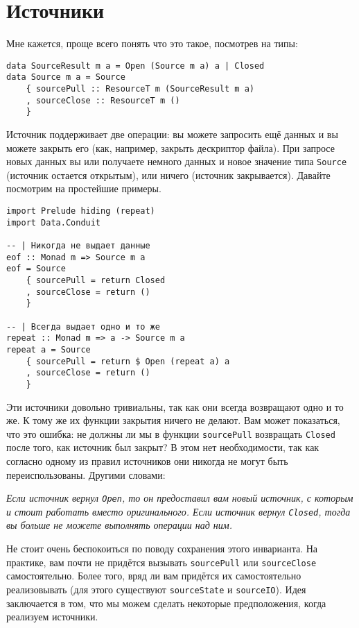 \section{Источники}

Мне кажется, проще всего понять что это такое, посмотрев на типы:
\begin{lstlisting}
data SourceResult m a = Open (Source m a) a | Closed
data Source m a = Source
    { sourcePull :: ResourceT m (SourceResult m a)
    , sourceClose :: ResourceT m ()
    }
\end{lstlisting}
Источник поддерживает две операции: вы можете запросить ещё данных и вы можете закрыть его (как,
например, закрыть дескриптор файла). При запросе новых данных вы или получаете немного
данных и новое значение типа \lstinline=Source= (источник остается открытым), или
ничего (источник закрывается). Давайте посмотрим на простейшие примеры.
\begin{lstlisting}
import Prelude hiding (repeat)
import Data.Conduit

-- | Никогда не выдает данные
eof :: Monad m => Source m a
eof = Source
    { sourcePull = return Closed
    , sourceClose = return ()
    }

-- | Всегда выдает одно и то же
repeat :: Monad m => a -> Source m a
repeat a = Source
    { sourcePull = return $ Open (repeat a) a
    , sourceClose = return ()
    }
\end{lstlisting}
Эти источники довольно тривиальны, так как они всегда возвращают одно и то же. К тому
же их функции закрытия ничего не делают. Вам может показаться, что это ошибка: не должны ли
мы в функции \lstinline=sourcePull= возвращать \lstinline=Closed= после того, как
источник был
закрыт? В этом нет необходимости, так как согласно одному из правил
источников они никогда не могут быть переиспользованы. Другими словами:

\textit{Если источник вернул \lstinline=Open=, то он предоставил вам новый источник, с
которым и
стоит работать вместо оригинального. Если источник вернул \lstinline=Closed=, тогда вы
больше не можете выполнять операции над ним.}

Не стоит очень беспокоиться по поводу сохранения этого инварианта. На практике, вам почти
не придётся вызывать \lstinline=sourcePull= или \lstinline=sourceClose= самостоятельно.
Более того, вряд ли вам придётся их самостоятельно реализовывать (для этого существуют
\lstinline=sourceState= и \lstinline=sourceIO=).
Идея заключается в том, что мы можем сделать некоторые предположения, когда реализуем
источники.

